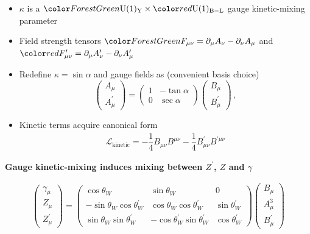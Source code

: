 \documentclass[10pt,xcolor=dvipsnames,mathserif]{beamer}
\begin{document}
\begin{frame}
		\begin{itemize}
			\item $\kappa$ is a ${\green \U{Y}} \times {\red \U{B-L}}$ gauge
			kinetic-mixing parameter
			\vskip2mm
			\item Field strength tensors ${\green F_{\mu \nu} = \partial_\mu A_\nu - \partial_\nu A_\mu}$ and ${\red F^\prime_{\mu \nu} = \partial_\mu A^\prime_\nu - \partial_\nu A^\prime_\mu}$
			\item {\blue Redefine $\kappa = \sin \alpha$ and gauge fields as (convenient basis choice)}
			\begin{equation*}
				\begin{pmatrix}
				A_\mu \\
				A^\prime_\mu 
				\end{pmatrix}
				=
				\begin{pmatrix}
				1 & -\tan \alpha \\
				0 & \sec \alpha 
				\end{pmatrix}
				\begin{pmatrix}
				B_\mu \\
				B^\prime_\mu 
				\end{pmatrix}\,,
				\label{eq:trans-kappa}
			\end{equation*}	
			\item Kinetic terms acquire canonical form
			\begin{equation*}
				\begin{aligned}
				\mathcal{L}_\mathrm{kinetic} =   -\dfrac{1}{4} B_{\mu \nu} B^{\mu \nu} -\dfrac{1}{4} B^\prime_{\mu \nu} B^{\prime \mu \nu}
				\end{aligned}
				\end{equation*}					
		\end{itemize}
		
		
		\begin{exampleblock}{}
			{\bf Gauge kinetic-mixing induces mixing between $Z^\prime$, $Z$ and $\gamma$ }
		\end{exampleblock} 
		
		\begin{equation*}
			\begin{aligned}
			\begin{pmatrix}
			\gamma_\mu \\
			Z_\mu \\
			Z^\prime_\mu
			\end{pmatrix}
			=
			\begin{pmatrix}
			\cos \theta_W & \sin \theta_W & 0\\
			-\sin \theta_W \cos \theta_W^\prime & \cos \theta_W \cos \theta_W^\prime & \sin \theta_W^\prime \\
			\sin \theta_W \sin \theta_W^\prime & -\cos \theta_W^\prime \sin \theta_W^\prime & \cos \theta_W^\prime
			\end{pmatrix}
			\begin{pmatrix}
			B_\mu \\
			A^3_\mu \\
			B^\prime_\mu
			\end{pmatrix}
			\end{aligned}
		\end{equation*}
	

\end{frame}
\end{document}
